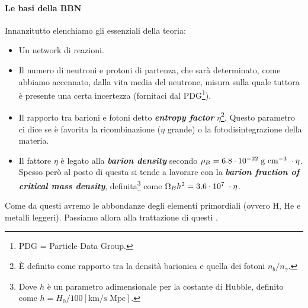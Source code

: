 
\paragraph{Le basi della BBN} Innanzitutto elenchiamo gli  essenziali della teoria:
\begin{itemize}
    \item Un network di reazioni.
    \item Il numero di neutroni e protoni di partenza, che sarà determinato, come abbiamo accennato, dalla vita media del neutrone, misura sulla quale tuttora è presente una certa incertezza (fornitaci dal PDG\footnote{PDG = Particle Data Group.}).
    \item Il rapporto tra barioni e fotoni detto \textbf{\textit{entropy factor}} $\eta$\footnote{È definito come rapporto tra la densità barionica e quella dei fotoni $n_b/n_\gamma$.}. Questo parametro ci dice se è favorita la ricombinazione ($\eta$ grande) o la fotodisintegrazione della materia.
    \item Il fattore $\eta$ è legato alla \textbf{\textit{barion density}} secondo $\rho_B = 6.8\cdot10^{-22}\;\mbox{g cm}^{-3}\; \cdot \eta$. Spesso però al posto di questa si tende a lavorare con la \textbf{\textit{barion fraction of critical mass density}}, definita\footnote{Dove $h$ è un parametro adimensionale per la costante di Hubble, definito come $h=H_0/100 [\mbox{km}/\mbox{s Mpc}]$.} come $\Omega_B h^2= 3.6 \cdot10^{7}\;\cdot \eta$.
\end{itemize}
Come  da questi avremo le abbondanze degli elementi primordiali (ovvero H, He e metalli leggeri). Passiamo allora alla trattazione di questi .

